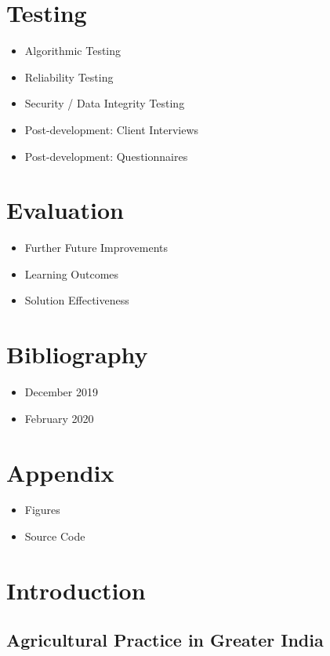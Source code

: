 \documentclass[a4paper,11pt]{proc}
\begin{document}
\section{Testing}

    \begin{itemize}
      \item Algorithmic Testing
      \item Reliability Testing
      \item Security / Data Integrity Testing
      \item Post-development: Client Interviews
      \item Post-development: Questionnaires
    \end{itemize}

\section{Evaluation}

    \begin{itemize}
      \item Further Future Improvements
      \item Learning Outcomes
      \item Solution Effectiveness
    \end{itemize}
  
\section{Bibliography}
\begin{itemize}
 	\item December 2019
 	\item February 2020
\end{itemize}
    
\section{Appendix}
    \begin{itemize}
      \item Figures
      \item Source Code
    \end{itemize}

\newpage
\setcounter{section}{0}
\onecolumn

\section{Introduction}
\subsection{Agricultural Practice in Greater India}
\end{document}
